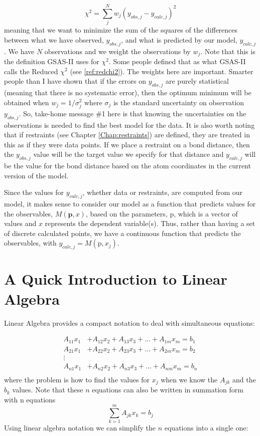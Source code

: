 $$\chi^2 = \sum_j^N w_j(y_{obs,j}-y_{calc,j})^2$$
meaning that we want to minimize the sum of the squares of the differences between what we have observed, $y_{obs,j}$, and what is predicted by our model, $y_{calc,j}$. We have $N$ observations and we weight the observations by $w_j$. Note that this is the definition GSAS-II uses for $\chi^2$. Some people defined that as what GSAS-II calls the Reduced $\chi^2$ (see \ref{ref:redchi2}). The weights here are important.  Smarter people than I have shown that if the errors on $y_{obs,j}$ are purely statistical (meaning that there is no systematic error), then the optimum minimum will be obtained when $w_j= 1 / \sigma^2_j$ where $\sigma_j$ is the standard uncertainty on observation $y_{obs,j}$. So, take-home message \#1 here is that knowing the uncertainties on the observations is needed to find the best model for the data. It is also worth noting that if restraints (see Chapter \ref{Chap:restraints}) are defined, they are treated in this as if they were data points. If we place a restraint on a bond distance, then the $y_{obs,j}$ value will be the target value we specify for that distance and $y_{calc,j}$ will be the value for the bond distance based on the atom coordinates in the current version of the model. 

Since the values for  $y_{calc,j}$, whether data or restraints, are computed from our model, it makes sense to consider our model as a function that predicts values for the observables, $M(\mathbf{p},x)$, based on the parameters, $\mathrm{p}$, which is a vector of values and $x$ represents the dependent variable(s). Thus, rather than having a set of discrete calculated points, we have a continuous function that predicts the observables, with $y_{calc,j} = M(\mathrm{p}, x_j)$. 

\section{A Quick Introduction to Linear Algebra}

Linear Algebra provides a compact notation to deal with simultaneous equations:

\begin{align}
A_{11}x_1 &+ A_{12}x_2 + A_{13}x_3 + \ldots + A_{1m}x_m =  b_1\\
A_{21}x_1 &+ A_{22}x_2 + A_{23}x_3 + \ldots + A_{2m}x_m =  b_2\\
\vdots\\
A_{n1}x_1 &+ A_{n2}x_2 + A_{n3}x_3 + \ldots + A_{nm}x_m =  b_n\\
\end{align}
where the problem is how to find the values for $x_j$ when we know the $A_{jk}$ and the $b_k$ values. Note that these $n$ equations can also be written in summation form with n equations 
$$\sum_{k=1}^m A_{jk} x_k = b_j$$
Using linear algebra notation we can simplify the $n$ equations into a single one:

